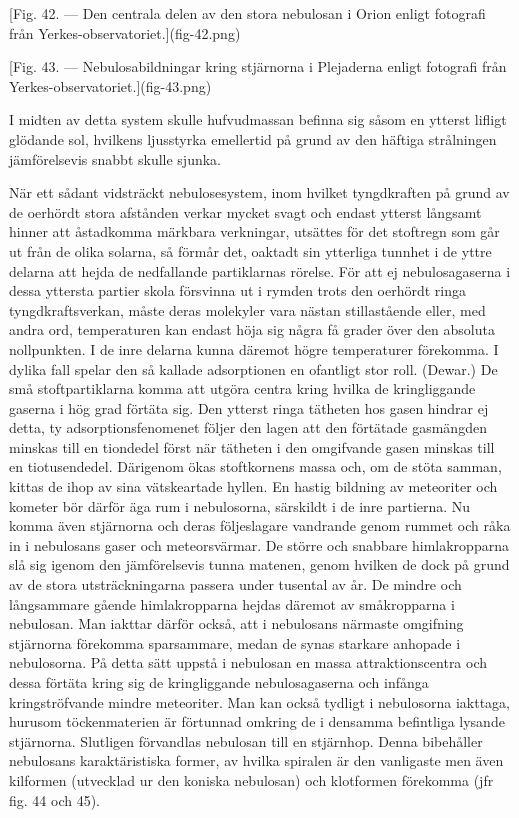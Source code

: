 \documentclass[a4paper, 12pt, oneside, swedish]{article}
\begin{document}
[Fig. 42. --- Den centrala delen av den stora nebulosan i Orion enligt fotografi från Yerkes-observatoriet.](fig-42.png)

[Fig. 43. --- Nebulosabildningar kring stjärnorna i Plejaderna enligt fotografi från Yerkes-observatoriet.](fig-43.png)

I midten av detta system skulle hufvudmassan befinna sig såsom en ytterst lifligt glödande sol, hvilkens ljusstyrka emellertid på grund av den häftiga strålningen jämförelsevis snabbt skulle sjunka.

När ett sådant vidsträckt nebulosesystem, inom hvilket tyngdkraften på grund av de oerhördt stora afstånden verkar mycket svagt och endast ytterst långsamt hinner att åstadkomma märkbara verkningar, utsättes för det stoftregn som går ut från de olika solarna, så förmår det, oaktadt sin ytterliga tunnhet i de yttre delarna att hejda de nedfallande partiklarnas rörelse. För att ej nebulosagaserna i dessa yttersta partier skola försvinna ut i rymden trots den oerhördt ringa tyngdkraftsverkan, måste deras molekyler vara nästan stillastående eller, med andra ord, temperaturen kan endast höja sig några få grader över den absoluta nollpunkten. I de inre delarna kunna däremot högre temperaturer förekomma. I dylika fall spelar den så kallade adsorptionen en ofantligt stor roll. (Dewar.) De små stoftpartiklarna komma att utgöra centra kring hvilka de kringliggande gaserna i hög grad förtäta sig. Den ytterst ringa tätheten hos gasen hindrar ej detta, ty adsorptionsfenomenet följer den lagen att den förtätade gasmängden minskas till en tiondedel först när tätheten i den omgifvande gasen minskas till en tiotusendedel. Därigenom ökas stoftkornens massa och, om de stöta samman, kittas de ihop av sina vätskeartade hyllen. En hastig bildning av meteoriter och kometer bör därför äga rum i nebulosorna, särskildt i de inre partierna. Nu komma även stjärnorna och deras följeslagare vandrande genom rummet och råka in i nebulosans gaser och meteorsvärmar. De större och snabbare himlakropparna slå sig igenom den jämförelsevis tunna matenen, genom hvilken de dock på grund av de stora utsträckningarna passera under tusental av år. De mindre och långsammare gående himlakropparna hejdas däremot av småkropparna i nebulosan. Man iakttar därför också, att i nebulosans närmaste omgifning stjärnorna förekomma sparsammare, medan de synas starkare anhopade i nebulosorna. På detta sätt uppstå i nebulosan en massa attraktionscentra och dessa förtäta kring sig de kringliggande nebulosagaserna och infånga kringströfvande mindre meteoriter. Man kan också tydligt i nebulosorna iakttaga, hurusom töckenmaterien är förtunnad omkring de i densamma befintliga lysande stjärnorna. Slutligen förvandlas nebulosan till en stjärnhop. Denna bibehåller nebulosans karaktäristiska former, av hvilka spiralen är den vanligaste men även kilformen (utvecklad ur den koniska nebulosan) och klotformen förekomma (jfr fig. 44 och 45).
\end{document}
